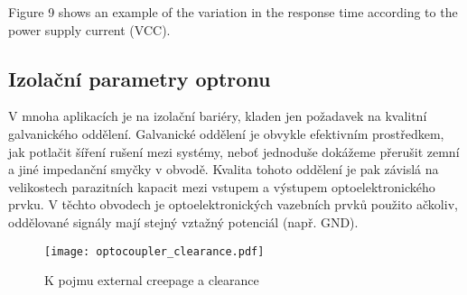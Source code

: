 {          Figure 9 shows an example of the variation in the response time according to the power
          supply current (VCC).
          
      \subsection{Izolační parametry optronu}
        V mnoha aplikacích je na izolační bariéry, kladen jen požadavek na kvalitní galvanického
        oddělení. Galvanické oddělení je obvykle efektivním prostředkem, jak potlačit šíření rušení
        mezi systémy, neboť jednoduše dokážeme přerušit zemní a jiné impedanční smyčky v obvodě.
        Kvalita tohoto oddělení je pak závislá na velikostech parazitních kapacit mezi vstupem a
        výstupem optoelektronického prvku. V těchto obvodech je optoelektronických vazebních prvků
        použito ačkoliv, oddělované signály mají stejný vztažný potenciál (např. GND). 
        
        \begin{figure}[hb!]
          \centering
          \texttt{[image: optocoupler\_clearance.pdf]}
          \caption{K pojmu external creepage a clearance}
          \label{es:fig_optocoupler_clearance}
        \end{figure}

} %
\printbibliography[title={Seznam literatury}, heading=subbibliography]
